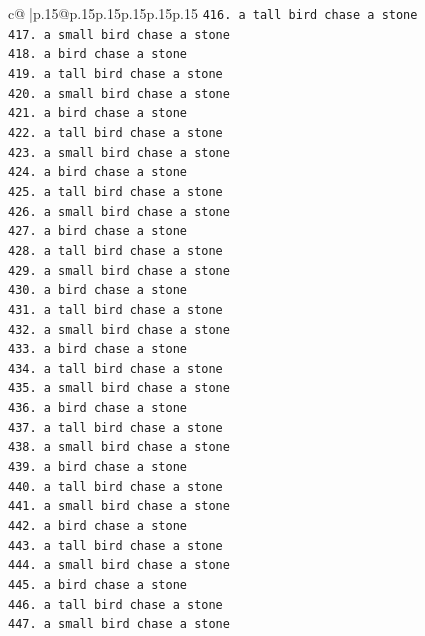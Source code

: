 \documentclass{article}
\begin{document}
{\begin{supertabular}{c@{$\;$}|p{.15\linewidth}@{}p{.15\linewidth}p{.15\linewidth}p{.15\linewidth}p{.15\linewidth}p{.15\linewidth}}
{{{\texttt{416. a tall bird chase a stone} \\
\texttt{417. a small bird chase a stone} \\
\texttt{418. a bird chase a stone} \\
\texttt{419. a tall bird chase a stone} \\
\texttt{420. a small bird chase a stone} \\
\texttt{421. a bird chase a stone} \\
\texttt{422. a tall bird chase a stone} \\
\texttt{423. a small bird chase a stone} \\
\texttt{424. a bird chase a stone} \\
\texttt{425. a tall bird chase a stone} \\
\texttt{426. a small bird chase a stone} \\
\texttt{427. a bird chase a stone} \\
\texttt{428. a tall bird chase a stone} \\
\texttt{429. a small bird chase a stone} \\
\texttt{430. a bird chase a stone} \\
\texttt{431. a tall bird chase a stone} \\
\texttt{432. a small bird chase a stone} \\
\texttt{433. a bird chase a stone} \\
\texttt{434. a tall bird chase a stone} \\
\texttt{435. a small bird chase a stone} \\
\texttt{436. a bird chase a stone} \\
\texttt{437. a tall bird chase a stone} \\
\texttt{438. a small bird chase a stone} \\
\texttt{439. a bird chase a stone} \\
\texttt{440. a tall bird chase a stone} \\
\texttt{441. a small bird chase a stone} \\
\texttt{442. a bird chase a stone} \\
\texttt{443. a tall bird chase a stone} \\
\texttt{444. a small bird chase a stone} \\
\texttt{445. a bird chase a stone} \\
\texttt{446. a tall bird chase a stone} \\
\texttt{447. a small bird chase a stone} \\
}}}
\end{supertabular}}
\end{document}
